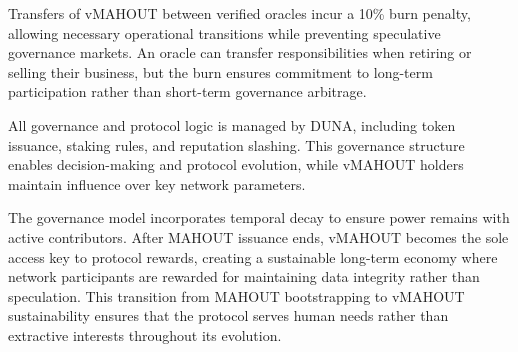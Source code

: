 Transfers of vMAHOUT between verified oracles incur a 10\% burn penalty, allowing necessary operational transitions while preventing speculative governance markets. An oracle can transfer responsibilities when retiring or selling their business, but the burn ensures commitment to long-term participation rather than short-term governance arbitrage.

All governance and protocol logic is managed by DUNA, including token issuance, staking rules, and reputation slashing. This governance structure enables decision-making and protocol evolution, while vMAHOUT holders maintain influence over key network parameters.

The governance model incorporates temporal decay to ensure power remains with active contributors. After MAHOUT issuance ends, vMAHOUT becomes the sole access key to protocol rewards, creating a sustainable long-term economy where network participants are rewarded for maintaining data integrity rather than speculation. This transition from MAHOUT bootstrapping to vMAHOUT sustainability ensures that the protocol serves human needs rather than extractive interests throughout its evolution.